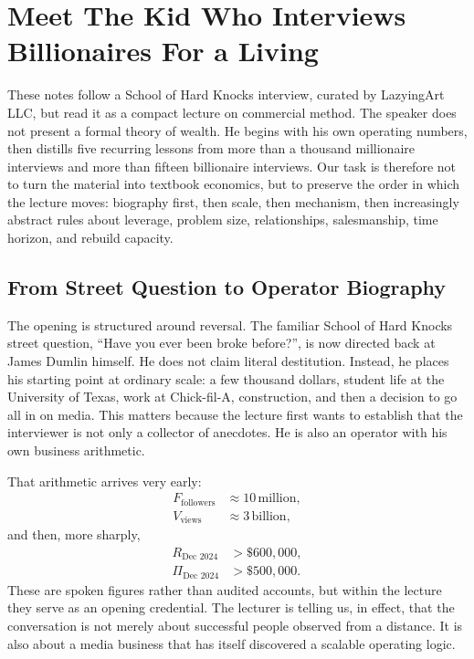 \chapter{Meet The Kid Who Interviews Billionaires For a Living}

These notes follow a School of Hard Knocks interview, curated by LazyingArt LLC, but read it as a compact lecture on commercial method. The speaker does not present a formal theory of wealth. He begins with his own operating numbers, then distills five recurring lessons from more than a thousand millionaire interviews and more than fifteen billionaire interviews. Our task is therefore not to turn the material into textbook economics, but to preserve the order in which the lecture moves: biography first, then scale, then mechanism, then increasingly abstract rules about leverage, problem size, relationships, salesmanship, time horizon, and rebuild capacity.

\section{From Street Question to Operator Biography}

The opening is structured around reversal. The familiar School of Hard Knocks street question, ``Have you ever been broke before?'', is now directed back at James Dumlin himself. He does not claim literal destitution. Instead, he places his starting point at ordinary scale: a few thousand dollars, student life at the University of Texas, work at Chick-fil-A, construction, and then a decision to go all in on media. This matters because the lecture first wants to establish that the interviewer is not only a collector of anecdotes. He is also an operator with his own business arithmetic.

That arithmetic arrives very early:
\begin{align}
F_{\text{followers}} &\approx 10\,\text{million}, \\
V_{\text{views}} &\approx 3\,\text{billion},
\end{align}
and then, more sharply,
\begin{align}
R_{\text{Dec 2024}} &> \$600{,}000, \\
\Pi_{\text{Dec 2024}} &> \$500{,}000.
\end{align}
These are spoken figures rather than audited accounts, but within the lecture they serve as an opening credential. The lecturer is telling us, in effect, that the conversation is not merely about successful people observed from a distance. It is also about a media business that has itself discovered a scalable operating logic.

